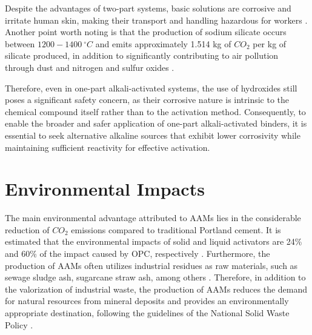 Despite the advantages of two-part systems, basic solutions are corrosive and irritate human skin, making their transport and handling hazardous for workers \cite{awoyera2019critical}.
Another point worth noting is that the production of sodium silicate occurs between $1200-1400\ ^\circ C$ and emits approximately 1.514 kg of $CO_2$ per kg of silicate produced, in addition to significantly contributing to air pollution through dust and nitrogen and sulfur oxides \cite{rajan2020sustainable}.

Therefore, even in one-part alkali-activated systems, the use of hydroxides still poses a significant safety concern, as their corrosive nature is intrinsic to the chemical compound itself rather than to the activation method. Consequently, to enable the broader and safer application of one-part alkali-activated binders, it is essential to seek alternative alkaline sources that exhibit lower corrosivity while maintaining sufficient reactivity for effective activation.

\section{Environmental Impacts}

The main environmental advantage attributed to AAMs lies in the considerable reduction of $CO_2$ emissions compared to traditional Portland cement.
It is estimated that the environmental impacts of solid and liquid activators are 24\% and 60\% of the impact caused by OPC, respectively \cite{luukkonen2017review}.
Furthermore, the production of AAMs often utilizes industrial residues as raw materials, such as sewage sludge ash, sugarcane straw ash, among others \cite{moraes2024scsa}.
Therefore, in addition to the valorization of industrial waste, the production of AAMs reduces the demand for natural resources from mineral deposits and provides an environmentally appropriate destination, following the guidelines of the National Solid Waste Policy \cite{PNRS2016}.

